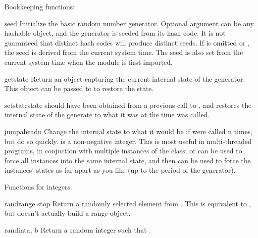 Bookkeeping functions:

\begin{funcdesc}{seed}{}
  Initialize the basic random number generator.
  Optional argument  can be any hashable object,
  and the generator is seeded from its hash code.
  It is not guaranteed that distinct hash codes will produce distinct
  seeds.
  If  is omitted or ,
  the seed is derived from the current system time.
  The seed is also set from the current system time when
  the module is first imported.
\end{funcdesc}

\begin{funcdesc}{getstate}{}
  Return an object capturing the current internal state of the generator.
  This object can be passed to  to restore the state.
 \end{funcdesc}

\begin{funcdesc}{setstate}{state}
   should have been obtained from a previous call to
  , and  restores the internal state
  of the generate to what it was at the time  was called.
 \end{funcdesc}

\begin{funcdesc}{jumpahead}{n}
  Change the internal state to what it would be if  were
  called n times, but do so quickly.   is a non-negative integer.
  This is most useful in multi-threaded programs, in conjuction with
  multiple instances of the  class:   or
   can be used to force all instances into the same
  internal state, and then  can be used to force the
  instances' states as far apart as you like (up to the period of the
  generator).
 \end{funcdesc}

Functions for integers:

\begin{funcdesc}{randrange}{ stop}
  Return a randomly selected element from .  This is equivalent to
  ,
  but doesn't actually build a range object.
\end{funcdesc}

\begin{funcdesc}{randint}{a, b}
  Return a random integer  such that
  .
\end{funcdesc}


